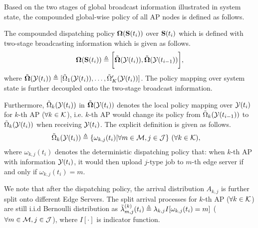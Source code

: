 Based on the two stages of global broadcast information illustrated in system state, the compounded global-wise policy of all AP nodes is defined as follows.
\begin{definition}
    The compounded dispatching policy $\boldsymbol{\Omega}(\mathbf{S}(t_{i}))$ over $\mathbf{S}(t_{i})$ which is defined with two-stage broadcasting information which is given as follows.
    \begin{align}
        \boldsymbol{\Omega}(\mathbf{S}(t_{i})) \triangleq \bigg[
            \tilde{\boldsymbol{\Omega}}(\mathcal{Y}(t_{i})), \tilde{\boldsymbol{\Omega}}(\mathcal{Y}(t_{i-1}))
        \bigg],
    \end{align}
    where
    $\tilde{\boldsymbol{\Omega}}(\mathcal{Y}(t_{i})) \triangleq [\tilde{\Omega}_{1}(\mathcal{Y}(t_{i})), \dots, \tilde{\Omega}'_{K}(\mathcal{Y}(t_{i}))]$.
    The policy mapping over system state is further decoupled onto the two-stage broadcast information.

    Furthermore,
    $\tilde{\Omega}_{k}(\mathcal{Y}(t_{i}))$ in $\tilde{\boldsymbol{\Omega}}(\mathcal{Y}(t_{i}))$
    denotes the local policy mapping over $\mathcal{Y}(t_{i})$ for $k$-th AP ($\forall k\in\mathcal{K}$), i.e. $k$-th AP would change its policy from $\tilde{\Omega}_{k}(\mathcal{Y}(t_{i-1}))$ to $\tilde{\Omega}_{k}(\mathcal{Y}(t_{i}))$ when receiving $\mathcal{Y}(t_{i})$.
    The explicit definition is given as follows.
    \begin{align}
        &\tilde{\Omega}_{k}(\mathcal{Y}(t_{i})) \triangleq \{\omega_{k,j}(t_{i})|\forall m\in\mathcal{M}, j\in\mathcal{J}\}
        ~(\forall k\in\mathcal{K}),
        \label{def_action}
    \end{align}
    where $\omega_{k,j}(t_{i})$ denotes the deterministic dispatching policy that: when $k$-th AP with information $\mathcal{Y}(t_{i})$, it would then upload $j$-type job to $m$-th edge server if and only if $\omega_{k,j}(t_{i})=m$.
\end{definition}

We note that after the dispatching policy, the arrival distribution $A_{k,j}$ is further split onto different Edge Servers. The split arrival processes for $k$-th AP ($\forall k\in\mathcal{K}$) are still i.i.d Bernoulli distribution as
$\tilde{\lambda}^{(k)}_{m,j}(t_{i}) \triangleq \lambda_{k,j} I[\omega_{k,j}(t_i) = m]$ ($\forall m\in\mathcal{M}, j\in\mathcal{J}$), where $I[\cdot]$ is indicator function.


